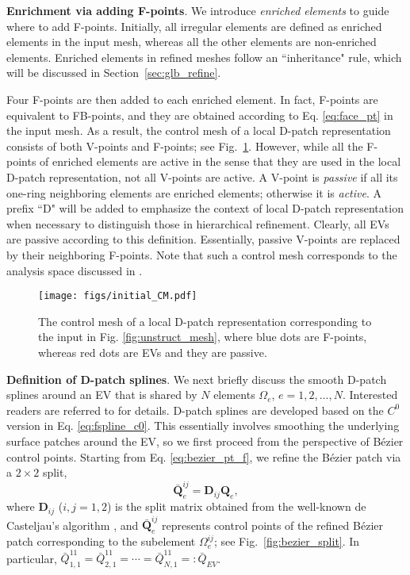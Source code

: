 \documentclass[graybox]{svmult}
\begin{document}
\vspace{+2mm}\noindent\textbf{Enrichment via adding F-points}. 
We introduce \emph{enriched elements} to guide where to add F-points. Initially, all irregular elements are defined as enriched elements in the input mesh, whereas all the other elements are non-enriched elements. Enriched elements in refined meshes follow an ``inheritance" rule, which will be discussed in Section~\ref{sec:glb_refine}. 

Four F-points are then added to each enriched element. In fact, F-points are equivalent to FB-points, and they are obtained according to Eq. \eqref{eq:face_pt} in the input mesh. As a result, the control mesh of a local D-patch representation consists of both V-points and F-points; see Fig.~\ref{fig:CM0}. However, while all the F-points of enriched elements are active in the sense that they are used in the local D-patch representation, not all V-points are active. A V-point is \emph{passive} if all its one-ring neighboring elements are enriched elements; otherwise it is \emph{active}. A prefix ``D" will be added to emphasize the context of local D-patch representation when necessary to distinguish those in hierarchical refinement. Clearly, all EVs are passive according to this definition. Essentially, passive V-points are replaced by their neighboring F-points. Note that such a control mesh corresponds to the analysis space discussed in \cite{ref:toshniwal17}.

\begin{figure}[htb]
\centering
\texttt{[image: figs/initial\_CM.pdf]}
\caption{The control mesh of a local D-patch representation corresponding to the input in Fig. \ref{fig:unstruct_mesh}, where blue dots are F-points, whereas red dots are EVs and they are passive.}
\label{fig:CM0}
\end{figure}

\vspace{+2mm}\noindent\textbf{Definition of D-patch splines}.
We next briefly discuss the smooth D-patch splines around an EV that is shared by $N$ elements $\Omega_e$, $e=1,2,\ldots,N$. Interested readers are referred to \cite{ref:reif97, ref:toshniwal17, ref:casquero20} for details. D-patch splines are developed based on the $C^0$ version in Eq. \eqref{eq:fspline_c0}. This essentially involves smoothing the underlying surface patches around the EV, so we first proceed from the perspective of B\'{e}zier control points. Starting from Eq. \eqref{eq:bezier_pt_f}, we refine the B\'{e}zier patch via a $2\times 2$ split,
\begin{equation}
\bar{\bm{Q}}_{e}^{ij} = \bm{D}_{ij} \bm{Q}_e,
\label{eq:bezier_split}
\end{equation}
where $\bm{D}_{ij}$ ($i,j=1,2$) is the split matrix obtained from the well-known de Casteljau's algorithm \cite{ref:boehm99}, and $\bar{\bm{Q}}_{e}^{ij}$ represents control points of the refined B\'{e}zier patch corresponding to the subelement $\Omega_e^{ij}$; see Fig.~\ref{fig:bezier_split}. In particular, $\bar{Q}_{1,1}^{11}=\bar{Q}_{2,1}^{11}=\cdots=\bar{Q}_{N,1}^{11}=:\bar{Q}_{EV}$.
\end{document}
